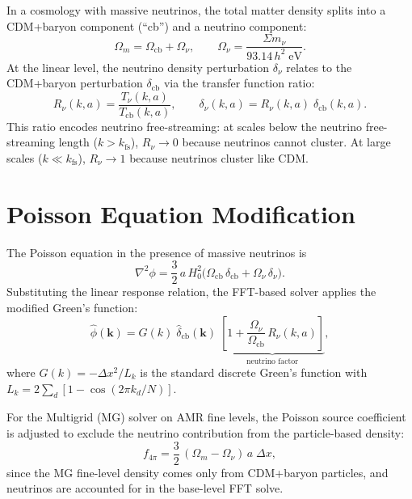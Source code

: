 \documentclass[11pt,fleqn]{book}
\begin{document}
In a cosmology with massive neutrinos, the total matter density splits
into a CDM+baryon component (``cb'') and a neutrino component:
\begin{equation}
  \Omega_m = \Omega_{\mathrm{cb}} + \Omega_\nu,
  \qquad
  \Omega_\nu = \frac{\Sigma m_\nu}{93.14\,h^2\;\text{eV}}.
\end{equation}
At the linear level, the neutrino density perturbation $\delta_\nu$
relates to the CDM+baryon perturbation $\delta_{\mathrm{cb}}$ via the
transfer function ratio:
\begin{equation}\label{eq:Rnu}
  R_\nu(k,a) = \frac{T_\nu(k,a)}{T_{\mathrm{cb}}(k,a)},
  \qquad
  \delta_\nu(k,a) = R_\nu(k,a)\;\delta_{\mathrm{cb}}(k,a).
\end{equation}
This ratio encodes neutrino free-streaming: at scales below the neutrino
free-streaming length ($k > k_{\mathrm{fs}}$), $R_\nu \to 0$ because
neutrinos cannot cluster.  At large scales ($k \ll k_{\mathrm{fs}}$),
$R_\nu \to 1$ because neutrinos cluster like CDM.

\section{Poisson Equation Modification}

The Poisson equation in the presence of massive neutrinos is
\begin{equation}\label{eq:poisson_nu}
  \nabla^2\phi = \frac{3}{2}\,a\,H_0^2
    \bigl(\Omega_{\mathrm{cb}}\,\delta_{\mathrm{cb}}
    + \Omega_\nu\,\delta_\nu\bigr).
\end{equation}
Substituting the linear response relation, the FFT-based solver applies
the modified Green's function:
\begin{equation}\label{eq:green_nu}
  \hat\phi(\mathbf{k}) = G(k)\;\hat\delta_{\mathrm{cb}}(\mathbf{k})
  \;\underbrace{\left[1 + \frac{\Omega_\nu}{\Omega_{\mathrm{cb}}}\,
    R_\nu(k,a)\right]}_{\text{neutrino factor}},
\end{equation}
where $G(k) = -\Delta x^2 / L_k$ is the standard discrete Green's function
with $L_k = 2\sum_d[1 - \cos(2\pi k_d/N)]$.

For the Multigrid (MG) solver on AMR fine levels, the Poisson source
coefficient is adjusted to exclude the neutrino contribution from the
particle-based density:
\begin{equation}
  f_{4\pi} = \frac{3}{2}\,(\Omega_m - \Omega_\nu)\,a\;\Delta x,
\end{equation}
since the MG fine-level density comes only from CDM+baryon particles,
and neutrinos are accounted for in the base-level FFT solve.
\end{document}
